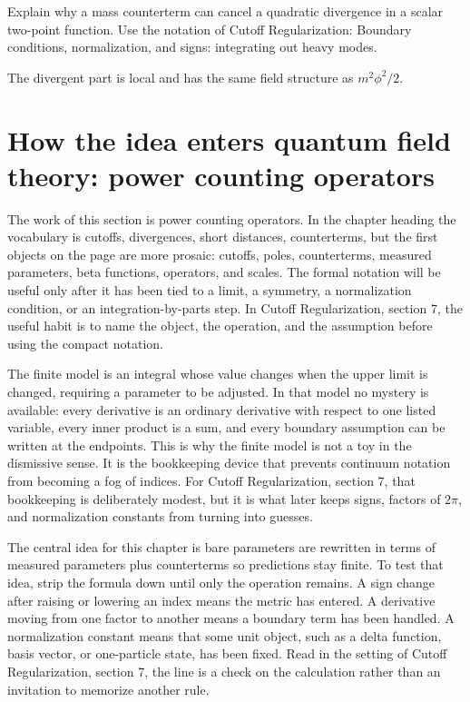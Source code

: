 \begin{exercise}
Explain why a mass counterterm can cancel a quadratic divergence in a scalar two-point function.  Use the notation of Cutoff Regularization: Boundary conditions, normalization, and signs: integrating out heavy modes.
\begin{answer}
The divergent part is local and has the same field structure as \(m^2\phi^2/2\).
\end{answer}
\end{exercise}



\section{How the idea enters quantum field theory: power counting operators}

The work of this section is power counting operators.  In the chapter heading the vocabulary is cutoffs, divergences, short distances, counterterms, but the first objects on the page are more prosaic: cutoffs, poles, counterterms, measured parameters, beta functions, operators, and scales.  The formal notation will be useful only after it has been tied to a limit, a symmetry, a normalization condition, or an integration-by-parts step.  In Cutoff Regularization, section 7, the useful habit is to name the object, the operation, and the assumption before using the compact notation.

The finite model is an integral whose value changes when the upper limit is changed, requiring a parameter to be adjusted.  In that model no mystery is available: every derivative is an ordinary derivative with respect to one listed variable, every inner product is a sum, and every boundary assumption can be written at the endpoints.  This is why the finite model is not a toy in the dismissive sense.  It is the bookkeeping device that prevents continuum notation from becoming a fog of indices.  For Cutoff Regularization, section 7, that bookkeeping is deliberately modest, but it is what later keeps signs, factors of \(2\pi\), and normalization constants from turning into guesses.

The central idea for this chapter is bare parameters are rewritten in terms of measured parameters plus counterterms so predictions stay finite.  To test that idea, strip the formula down until only the operation remains.  A sign change after raising or lowering an index means the metric has entered.  A derivative moving from one factor to another means a boundary term has been handled.  A normalization constant means that some unit object, such as a delta function, basis vector, or one-particle state, has been fixed.  Read in the setting of Cutoff Regularization, section 7, the line is a check on the calculation rather than an invitation to memorize another rule.

